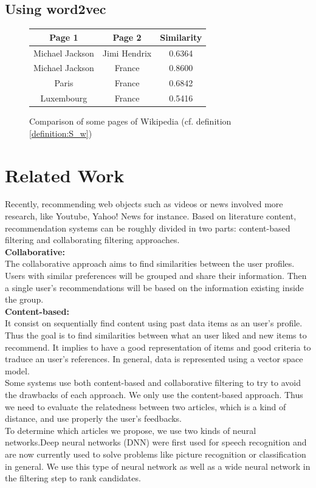 \documentclass[11pt]{article}
\theoremstyle{plain}
\theoremstyle{definition}
\theoremstyle{remark}
\begin{document}
\subsection{Using word2vec}


\begin{figure}[hb]
    \caption{Comparison of some pages of Wikipedia (cf. definition \ref{definition:S_w})}
    \label{fig:similarity}
	\centering
	\begin{tabular}{c|c|c}
		Page 1			&	Page 2			&	Similarity \\
		\hline\hline
		Michael Jackson	&	Jimi Hendrix	&	0.6364	\\
		Michael Jackson	&	France			&	0.8600	\\
		Paris			&	France			&	0.6842	\\
		Luxembourg		&	France			&	0.5416	\\
  \end{tabular}
\end{figure}


\section{Related Work}
Recently, recommending web objects such as videos or news involved more research, like Youtube, Yahoo! News for instance. Based on literature content, recommendation systems can be roughly divided in two parts: content-based filtering and collaborating filtering approaches.\\
\textbf{Collaborative: }\\
The collaborative approach aims to find similarities between the user profiles. Users with similar preferences will be grouped and share their information. Then a single user's recommendations will be based on the information existing inside the group.\\
\textbf{Content-based: }\\ 
It consist on sequentially find content using past data items as an user's profile. Thus the goal is to find similarities between what an user liked and new items to recommend. It implies to have a good representation of items and good criteria to traduce an user's references. In general, data is represented using a vector space model.\\
Some systems use both content-based and collaborative filtering to try to avoid the drawbacks of each approach. We only use the content-based approach. Thus we need to evaluate the relatedness between two articles, which is a kind of distance, and use properly the user's feedbacks.\\
To determine which articles we propose, we use two kinds of neural networks.Deep neural networks (DNN) were first used for speech recognition and are now currently used to solve problems like picture recognition or classification in general. We use this type of neural network as well as a wide neural network in the filtering step to rank candidates.




\end{document}
